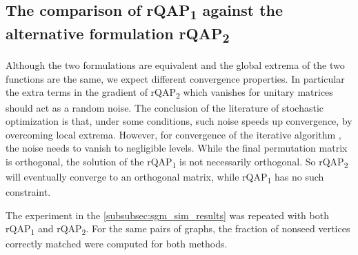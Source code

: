 \documentclass[12pt,oneside,final]{thesis}\usepackage[]{graphicx}\usepackage[]{color}
\begin{document}
\subsection{The comparison of rQAP\textsubscript{1} against the alternative formulation rQAP\textsubscript{2}}
Although the two formulations are equivalent and the global extrema of the two functions are the same, we expect different convergence  properties. In particular the extra terms in the gradient of rQAP\textsubscript{2} which vanishes for unitary matrices should act as a random noise. The conclusion of the literature of stochastic optimization  is that, under some conditions, such noise speeds up convergence, by overcoming local extrema. However, for convergence of the iterative algorithm , the noise needs to vanish to negligible levels. While the final permutation matrix is orthogonal, the solution of the rQAP\textsubscript{1} is not necessarily orthogonal. So rQAP\textsubscript{2}  will eventually converge to an orthogonal matrix, while rQAP\textsubscript{1}   has no such constraint.

The experiment in the \autoref{subsubsec:sgm_sim_results} was repeated with both rQAP\textsubscript{1} and rQAP\textsubscript{2}. For the same pairs of graphs,  the fraction of nonseed vertices correctly matched were computed for both methods.
\end{document}
